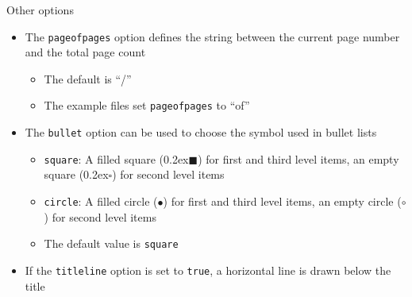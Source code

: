 \begin{frame}[t,fragile]{Other options}
\begin{itemize}
\item The \verb!pageofpages! option defines the string between the current
      page number and the total page count
  \begin{itemize}
  \item The default is ``/''
  \item The example files set \verb!pageofpages! to ``of''
  \end{itemize}
\item The \verb!bullet! option can be used to choose the symbol used in
      bullet lists
  \begin{itemize}
  \item \verb!square!: A filled square
        ({\tiny\raise0.2ex\hbox{$\blacksquare$}}) for
        first and third level items, an empty square
        ({\tiny\raise0.2ex\hbox{$\square$}}) for
        second level items
  \item \verb!circle!: A filled circle ({$\bullet$})
        for first and third level items, an empty circle
        ({$\circ$}) for second level items
  \item The default value is \verb!square!
  \end{itemize}
\item If the \verb!titleline! option is set to \verb!true!, a horizontal line
      is drawn below the title
\end{itemize}
\end{frame}

